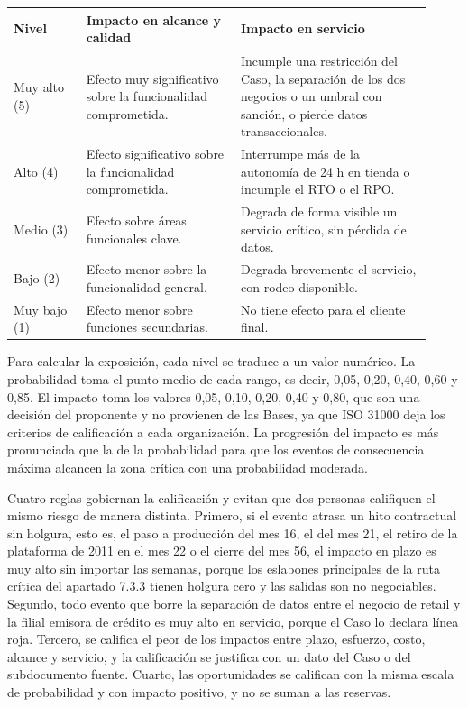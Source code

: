\documentclass[11pt]{article}
\begin{document}
\begin{longtable}{p{0.16\linewidth}p{0.34\linewidth}p{0.42\linewidth}}
\toprule
\textbf{Nivel} & \textbf{Impacto en alcance y calidad} & \textbf{Impacto en servicio} \\
\midrule
\endhead
\bottomrule
\endlastfoot
Muy alto (5) & Efecto muy significativo sobre la funcionalidad comprometida. & Incumple una restricción del Caso, la separación de los dos negocios o un umbral con sanción, o pierde datos transaccionales. \\
Alto (4) & Efecto significativo sobre la funcionalidad comprometida. & Interrumpe más de la autonomía de 24 h en tienda o incumple el RTO o el RPO. \\
Medio (3) & Efecto sobre áreas funcionales clave. & Degrada de forma visible un servicio crítico, sin pérdida de datos. \\
Bajo (2) & Efecto menor sobre la funcionalidad general. & Degrada brevemente el servicio, con rodeo disponible. \\
Muy bajo (1) & Efecto menor sobre funciones secundarias. & No tiene efecto para el cliente final. \\
\end{longtable}

Para calcular la exposición, cada nivel se traduce a un valor numérico. La probabilidad toma el punto medio de cada rango, es decir, 0,05, 0,20, 0,40, 0,60 y 0,85. El impacto toma los valores 0,05, 0,10, 0,20, 0,40 y 0,80, que son una decisión del proponente y no provienen de las Bases, ya que ISO 31000 deja los criterios de calificación a cada organización. La progresión del impacto es más pronunciada que la de la probabilidad para que los eventos de consecuencia máxima alcancen la zona crítica con una probabilidad moderada.

Cuatro reglas gobiernan la calificación y evitan que dos personas califiquen el mismo riesgo de manera distinta. Primero, si el evento atrasa un hito contractual sin holgura, esto es, el paso a producción del mes 16, el del mes 21, el retiro de la plataforma de 2011 en el mes 22 o el cierre del mes 56, el impacto en plazo es muy alto sin importar las semanas, porque los eslabones principales de la ruta crítica del apartado 7.3.3 tienen holgura cero y las salidas son no negociables. Segundo, todo evento que borre la separación de datos entre el negocio de retail y la filial emisora de crédito es muy alto en servicio, porque el Caso lo declara línea roja. Tercero, se califica el peor de los impactos entre plazo, esfuerzo, costo, alcance y servicio, y la calificación se justifica con un dato del Caso o del subdocumento fuente. Cuarto, las oportunidades se califican con la misma escala de probabilidad y con impacto positivo, y no se suman a las reservas.
\end{document}
